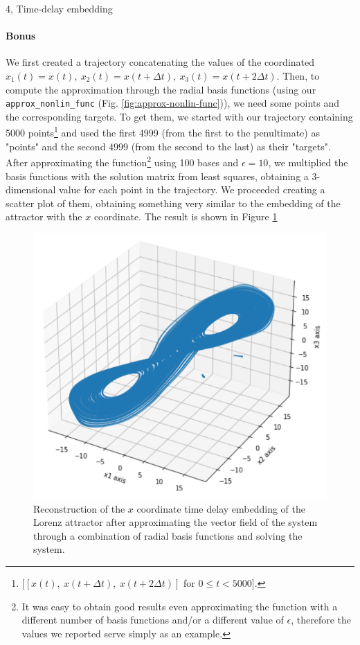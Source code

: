\documentclass[10pt,a4paper]{article}
\begin{document}
\begin{task}{4, Time-delay embedding}
\paragraph{Bonus}
We first created a trajectory concatenating the values of the coordinated $x_1(t) = x(t),\ x_2(t) = x(t + \Delta t),\ x_3(t) = x(t + 2 \Delta t)$.
Then, to compute the approximation through the radial basis functions (using our \texttt{approx\_nonlin\_func} (Fig. \ref{fig:approx-nonlin-func})), we need some points and the corresponding targets.
To get them, we started with our trajectory containing 5000 points\footnote{$[[x(t),\ x(t + \Delta t),\ x(t + 2 \Delta t)]$ for $0 \leq t < 5000]$.}
and used the first 4999 (from the first to the penultimate) as "points" and the second 4999 (from the second to the last) as their "targets".
After approximating the function\footnote{It was easy to obtain good results even approximating the function with a different number of basis functions and/or a different value of $\epsilon$, therefore the values we reported serve simply as an example.}
using 100 bases and $\epsilon=10$, we multiplied the basis functions with the solution matrix from least squares, obtaining a 3-dimensional value for each point in the trajectory.
We proceeded creating a scatter plot of them, obtaining something very similar to the embedding of the attractor with the $x$ coordinate.
The result is shown in Figure \ref{fig:4bonus}

\begin{figure}[H]
    \centering
    \includegraphics[scale=0.6]{images/4bonus.png}
    \caption{Reconstruction of the $x$ coordinate time delay embedding of the Lorenz attractor after approximating the vector field of the system through a combination of radial basis functions and solving the system.}
    \label{fig:4bonus}
\end{figure}
\end{task}
\end{document}
